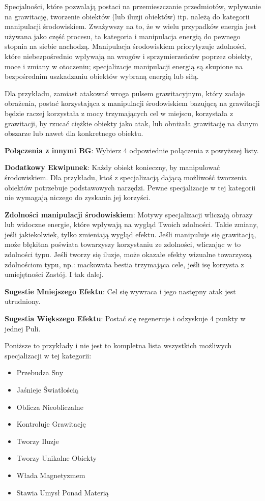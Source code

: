 Specjalności, które pozwalają postaci na przemieszczanie przedmiotów, wpływanie na grawitację, tworzenie obiektów (lub iluzji obiektów) itp. należą do kategorii manipulacji środowiskiem. Zważywszy na to, że w wielu przypadków energia jest używana jako część procesu, ta kategoria i manipulacja energią do pewnego stopnia na siebie nachodzą. Manipulacja środowiskiem priorytyzuje zdolności, które niebezpośrednio wpływają na wrogów i sprzymierzeńców poprzez obiekty, moce i zmiany w otoczeniu; specjalizacje manipulacji energią są skupione na bezpośrednim uszkadzaniu obiektów wybraną energią lub siłą.

Dla przykładu, zamiast atakować wroga pulsem grawitacyjnym, który zadaje obrażenia, postać korzystająca z manipulacji środowiskiem bazującą na grawitacji będzie raczej korzystała z mocy trzymających cel w miejscu, korzystała z grawitacji, by rzucać ciężkie obiekty jako atak, lub obniżała grawitację na danym obszarze lub nawet dla konkretnego obiektu.

\textbf{Połączenia z innymi BG}: Wybierz 4 odpowiednie połączenia z powyższej listy.

\textbf{Dodatkowy Ekwipunek}: Każdy obiekt konieczny, by manipulować środowiskiem. Dla przykładu, ktoś z specjalizacją dającą możliwość tworzenia obiektów potrzebuje podstawowych narzędzi. Pewne specjalizacje w tej kategorii nie wymagają niczego do zyskania jej korzyści.

\textbf{Zdolności manipulacji środowiskiem}: Motywy specjalizacji wliczają obrazy lub widoczne energie, które wpływają na wygląd Twoich zdolności. Takie zmiany, jeśli jakiekolwiek, tylko zmieniają wygląd efektu. Jeśli manipuluje się grawitacją, może błękitna poświata towarzyszy korzystaniu ze zdolności, wliczając w to zdolności typu. Jeśli tworzy się iluzje, może okazałe efekty wizualne towarzyszą zdolnościom typu, np.: mackowata bestia trzymająca cele, jeśli isę korzysta z umiejętności Zastój. I tak dalej.

\textbf{Sugestie Mniejszego Efektu}: Cel się wywraca i jego następny atak jest utrudniony.

\textbf{Sugestia Większego Efektu}: Postać się regeneruje i odzyskuje 4 punkty w jednej Puli.

Poniższe to przykłady i nie jest to kompletna lista wszystkich możliwych specjalizacji w tej kategorii:

\begin{itemize}
\item Przebudza Sny
\item Jaśnieje Światłością
\item Oblicza Nieobliczalne
\item Kontroluje Grawitację
\item Tworzy Iluzje
\item Tworzy Unikalne Obiekty
\item Włada Magnetyzmem
\item Stawia Umysł Ponad Materią
\end{itemize}    
    
